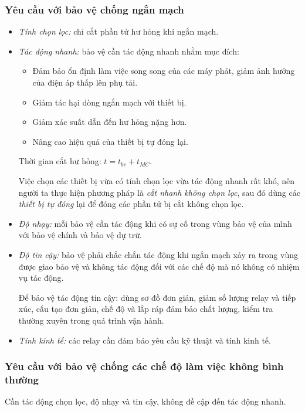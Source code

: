 \documentclass[12pt,a4paper]{article}
\begin{document}
\subsubsection{Yêu cầu với bảo vệ chống ngắn mạch}
	\begin{itemize}
		\item \emph{Tính chọn lọc:} chỉ cắt phần tử hư hỏng khi ngắn mạch.
		
		\item \emph{Tác động nhanh:} bảo vệ cần tác động nhanh nhằm mục đích:
			\begin{itemize}
				\item Đảm bảo ổn định làm việc song song của các máy phát, giảm ảnh hưởng của điện áp thấp lên phụ tải.
				
				\item Giảm tác hại dòng ngắn mạch với thiết bị.
				
				\item Giảm xác suất dẫn đến hư hỏng nặng hơn.
				
				\item Nâng cao hiệu quả của thiết bị tự đóng lại.
			\end{itemize}
			
			Thời gian cắt hư hỏng: $t = t_{bv} + t_{MC}$.
			
			Việc chọn các thiết bị vừa có tính chọn lọc vừa tác động nhanh rất khó, nên người ta thực hiện phương pháp là \emph{cắt nhanh không chọn lọc}, sau đó dùng các \emph{thiết bị tự đóng} lại để đóng các phần tử bị cắt không chọn lọc.
			
		\item \emph{Độ nhạy:} mỗi bảo vệ cần tác động khi có sự cố trong vùng bảo vệ của mình với bảo vệ chính và bảo vệ dự trữ.
		
		\item \emph{Độ tin cậy:} bảo vệ phải chắc chắn tác động khi ngắn mạch xảy ra trong vùng được giao bảo vệ và không tác động đối với các chế độ mà nó không có nhiệm vụ tác động.
		
		Để bảo vệ tác động tin cậy: dùng sơ đồ đơn giản, giảm số lượng relay và tiếp xúc, cấu tạo đơn giản, chế độ và lắp ráp đảm bảo chất lượng, kiểm tra thường xuyên trong quá trình vận hành.
		
		\item \emph{Tính kinh tế:} các relay cần đảm bảo yêu cầu kỹ thuật và tính kinh tế.
	\end{itemize}

\subsubsection{Yêu cầu với bảo vệ chống các chế độ làm việc không bình thường}
	Cần tác động chọn lọc, độ nhạy và tin cậy, không đề cập đến tác động nhanh.
	
\end{document}
